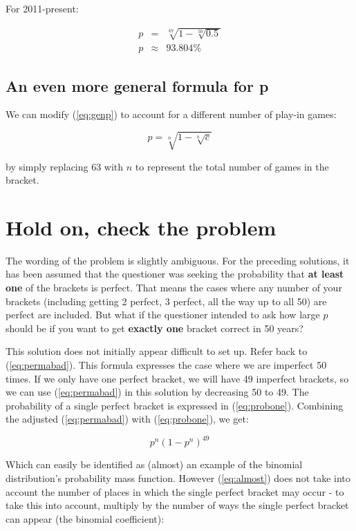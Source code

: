 \documentclass{article}
\begin{document}
For 2011-present:

\begin{eqnarray*}
    p &=& \sqrt[67]{1 - \sqrt[50]{0.5}}\\
    p &\approx& 93.804\%
\end{eqnarray*}

\subsection{An even more general formula for p}

We can modify (\ref{eq:genp}) to account for a different number of play-in games:

\begin{equation}
    p = \sqrt[n]{1 - \sqrt[b]{c}}
\end{equation}

by simply replacing 63 with $n$ to represent the total number of games in the bracket.

\section{Hold on, check the problem}

The wording of the problem is slightly ambiguous. For the preceding solutions, it has been assumed that the questioner was seeking the probability that \textbf{at least one} of the brackets is perfect. That means the cases where any number of your brackets (including getting 2 perfect, 3 perfect, all the way up to all 50) are perfect are included. But what if the questioner intended to ask how large $p$ should be if you want to get \textbf{exactly one} bracket correct in 50 years?

\vspace{5mm}

This solution does not initially appear difficult to set up. Refer back to (\ref{eq:permabad}). This formula expresses the case where we are imperfect 50 times. If we only have one perfect bracket, we will have 49 imperfect brackets, so we can use (\ref{eq:permabad}) in this solution by decreasing 50 to 49. The probability of a single perfect bracket is expressed in (\ref{eq:probone}). Combining the adjusted (\ref{eq:permabad}) with (\ref{eq:probone}), we get:

\begin{equation} \label{eq:almost}
    p^n(1-p^n)^{49}
\end{equation}

Which can easily be identified as (almost) an example of the binomial distribution's probability mass function. However (\ref{eq:almost}) does not take into account the number of places in which the single perfect bracket may occur - to take this into account, multiply by the number of ways the single perfect bracket can appear (the binomial coefficient):
\end{document}
